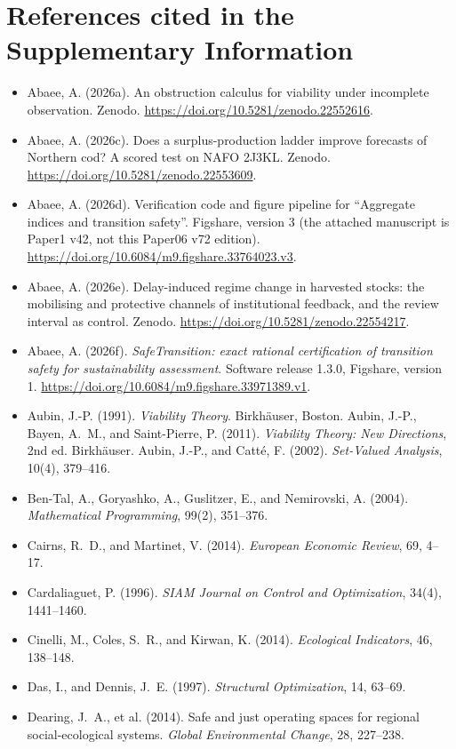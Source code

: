 \section*{References cited in the Supplementary Information}
\begin{itemize}[leftmargin=1.5em,itemsep=1pt]
\item Abaee, A. (2026a). An obstruction calculus for viability under incomplete observation. Zenodo. \url{https://doi.org/10.5281/zenodo.22552616}.
\item Abaee, A. (2026c). Does a surplus-production ladder improve forecasts of Northern cod? A scored test on NAFO 2J3KL. Zenodo. \url{https://doi.org/10.5281/zenodo.22553609}.
\item Abaee, A. (2026d). Verification code and figure pipeline for ``Aggregate indices and transition safety''. Figshare, version 3 (the attached manuscript is Paper1 v42, not this Paper06 v72 edition). \url{https://doi.org/10.6084/m9.figshare.33764023.v3}.
\item Abaee, A. (2026e). Delay-induced regime change in harvested stocks: the mobilising and protective channels of institutional feedback, and the review interval as control. Zenodo. \url{https://doi.org/10.5281/zenodo.22554217}.
\item Abaee, A. (2026f). \emph{SafeTransition: exact rational certification of transition safety for sustainability assessment}. Software release 1.3.0, Figshare, version 1. \url{https://doi.org/10.6084/m9.figshare.33971389.v1}.
\item Aubin, J.-P. (1991). \emph{Viability Theory}. Birkh\"auser, Boston. Aubin, J.-P., Bayen, A.~M., and Saint-Pierre, P. (2011). \emph{Viability Theory: New Directions}, 2nd ed. Birkh\"auser. Aubin, J.-P., and Catt\'e, F. (2002). \emph{Set-Valued Analysis}, 10(4), 379--416.
\item Ben-Tal, A., Goryashko, A., Guslitzer, E., and Nemirovski, A. (2004). \emph{Mathematical Programming}, 99(2), 351--376.
\item Cairns, R.~D., and Martinet, V. (2014). \emph{European Economic Review}, 69, 4--17.
\item Cardaliaguet, P. (1996). \emph{SIAM Journal on Control and Optimization}, 34(4), 1441--1460.
\item Cinelli, M., Coles, S.~R., and Kirwan, K. (2014). \emph{Ecological Indicators}, 46, 138--148.
\item Das, I., and Dennis, J.~E. (1997). \emph{Structural Optimization}, 14, 63--69.
\item Dearing, J.~A., et al. (2014). Safe and just operating spaces for regional social-ecological systems. \emph{Global Environmental Change}, 28, 227--238.

\end{itemize}
